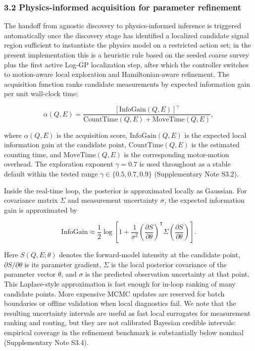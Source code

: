 \documentclass[
]{article}
\begin{document}
\hypertarget{physics-informed-acquisition-for-parameter-refinement}{%
\subsubsection{3.2 Physics-informed acquisition for parameter
refinement}\label{physics-informed-acquisition-for-parameter-refinement}}

The handoff from agnostic discovery to physics-informed inference is
triggered automatically once the discovery stage has identified a
localized candidate signal region sufficient to instantiate the physics
model on a restricted action set; in the present implementation this is
a heuristic rule based on the seeded coarse survey plus the first active
Log-GP localization step, after which the controller switches to
motion-aware local exploration and Hamiltonian-aware refinement. The
acquisition function ranks candidate measurements by expected
information gain per unit wall-clock time:

\[
\alpha(Q,E)=\frac{[\mathrm{InfoGain}(Q,E)]^\gamma}{\mathrm{CountTime}(Q,E)+\mathrm{MoveTime}(Q,E)},
\]

where \(\alpha(Q,E)\) is the acquisition score,
\(\mathrm{InfoGain}(Q,E)\) is the expected local information gain at the
candidate point, \(\mathrm{CountTime}(Q,E)\) is the estimated counting
time, and \(\mathrm{MoveTime}(Q,E)\) is the corresponding motor-motion
overhead. The exploration exponent \(\gamma = 0.7\) is used throughout
as a stable default within the tested range
\(\gamma \in \{0.5, 0.7, 0.9\}\) (Supplementary Note S3.2).

Inside the real-time loop, the posterior is approximated locally as
Gaussian. For covariance matrix \(\Sigma\) and measurement uncertainty
\(\sigma\), the expected information gain is approximated by

\[
\mathrm{InfoGain}\approx \frac{1}{2}\log\!\left[1+\frac{1}{\sigma^2}
\left(\frac{\partial S}{\partial \theta}\right)^\mathsf{T}
\Sigma
\left(\frac{\partial S}{\partial \theta}\right)\right].
\]

Here \(S(Q,E;\theta)\) denotes the forward-model intensity at the
candidate point, \(\partial S/\partial\theta\) is its parameter
gradient, \(\Sigma\) is the local posterior covariance of the parameter
vector \(\theta\), and \(\sigma\) is the predicted observation
uncertainty at that point. This Laplace-style approximation is fast
enough for in-loop ranking of many candidate points. More expensive MCMC
updates are reserved for batch boundaries or offline validation when
local diagnostics fail. We note that the resulting uncertainty intervals
are useful as fast local surrogates for measurement ranking and routing,
but they are not calibrated Bayesian credible intervals: empirical
coverage in the refinement benchmark is substantially below nominal
(Supplementary Note S3.4).
\end{document}
